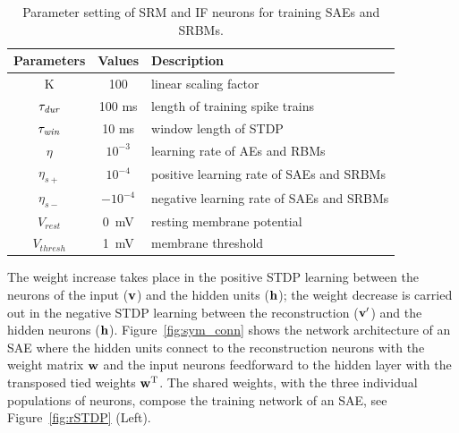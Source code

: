 \begin{table}[th]
	\centering
	\caption[Parameter setting of SRM.]{Parameter setting of SRM and IF neurons for training SAEs and SRBMs.}
	\bgroup
	\def\arraystretch{1.2}
	\begin{tabular}{c c l}
		Parameters & Values & Description \\
		\hline
		K & 100 & linear scaling factor\\
		$\tau_{\textit{\textrm{dur}}}$ & 100 ms &  length of training spike trains\\
		$\tau_{\textit{\textrm{win}}}$ & 10 ms & window length of STDP\\
		$\eta$ & $10^{-3}$ & learning rate of AEs and RBMs\\
		$\eta_{s+}$ & $10^{-4}$ & positive learning rate of SAEs and SRBMs\\
		$\eta_{s-}$ & $-10^{-4}$ & negative learning rate of SAEs and SRBMs\\
		$V_{rest}$ & 0~mV & resting membrane potential\\
		$V_{thresh}$ & 1~mV & membrane threshold  \\
	\end{tabular}
	\egroup
	\label{tbl:srm}
\end{table}

The weight increase takes place in the positive STDP learning between the neurons of the input ($\bf{v}$) and the hidden units ($\bf{h}$); 
the weight decrease is carried out in the negative STDP learning between the reconstruction ($\bf{v'}$) and the hidden neurons ($\bf{h}$).
Figure~\ref{fig:sym_conn} shows the network architecture of an SAE where the hidden units connect to the reconstruction neurons with the weight matrix $\bf{w}$ and the input neurons feedforward to the hidden layer with the transposed tied weights $\bf{w}^\textrm{T}$.
The shared weights, with the three individual populations of neurons, compose the training network of an SAE, see Figure~\ref{fig:rSTDP} (Left).

